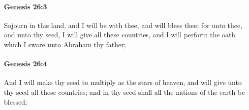 		\paragraph{Genesis 26:3} %
			\label{GENESIS-26-3}

			Sojourn in this land, and I will be with thee, and will bless thee; for unto thee, and unto thy seed, I will give all these countries, and I will perform the oath which I sware unto Abraham thy father;


		\paragraph{Genesis 26:4} %
			\label{GENESIS-26-4}

			And I will make thy seed to multiply as the stars of heaven, and will give unto thy seed all these countries; and in thy seed shall all the nations of the earth be blessed;


